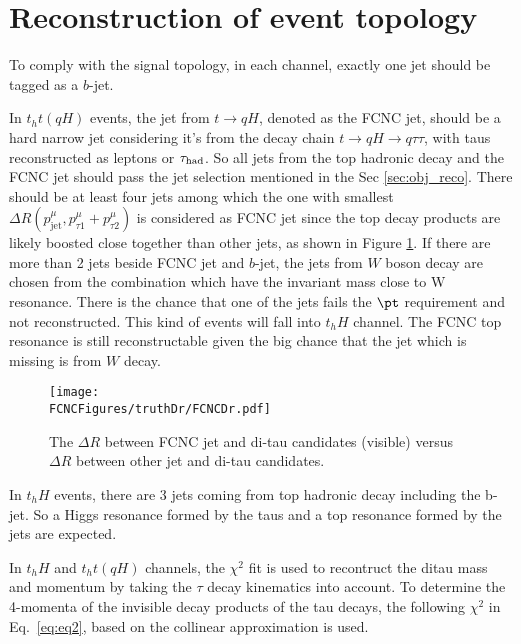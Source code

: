 \section{Reconstruction of event topology}
\label{sec:reconstruction}

To comply with the signal topology, in each channel, exactly one jet should be tagged as a $b$-jet. 

In $t_ht(qH)$ events, the jet from $t\to qH$, denoted as the FCNC jet, should be a hard narrow jet considering it's from the decay chain $t\to qH\to q\tau\tau$, with taus reconstructed as leptons or $\tau_\text{had}$. So all jets from the top hadronic decay and the FCNC jet should pass the jet selection mentioned in the Sec \ref{sec:obj_reco}. There should be at least four jets among which the one with smallest $\Delta R(p^{\mu}_{\text{jet}},p^{\mu}_{\tau1}+p^{\mu}_{\tau2})$ is considered as FCNC jet since the top decay products are likely boosted close together than other
jets, as shown in Figure \ref{fig:FCNCDr}. If there are more than 2 jets beside FCNC jet and $b$-jet, the jets from $W$ boson decay are chosen from the combination which have the invariant mass close to W resonance. There is the chance that one of the jets fails the $\pt$ requirement and not reconstructed. This kind of events will fall into $t_hH$ channel. The FCNC top resonance is still reconstructable given the big chance that the jet which is missing is from $W$ decay.

\begin{figure}[H]
\centering
\texttt{[image: \\FCNCFigures/truthDr/FCNCDr.pdf]}
\caption{The $\Delta R$ between FCNC jet and di-tau candidates (visible) versus $\Delta R$ between other jet and di-tau candidates.}
\label{fig:FCNCDr}
\end{figure}

In $t_hH$ events, there are 3 jets coming from top hadronic decay including the b-jet. So a Higgs resonance formed by the taus and a top resonance formed by the jets are expected.

In $t_hH$ and $t_ht(qH)$ channels, the $\chi^2$ fit
is used to recontruct the ditau mass and momentum by taking the $\tau$ decay kinematics into account. To determine the 4-momenta of the invisible decay products of the tau decays, the following $\chi^2$ in Eq.~\ref{eq:eq2}, based on the collinear approximation is used.

